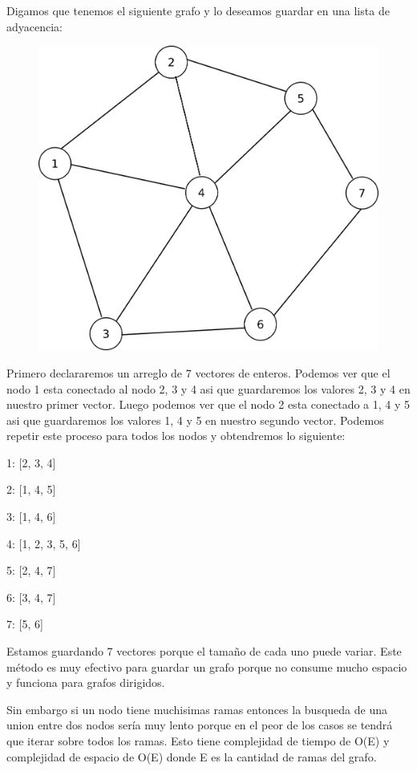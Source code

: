 \documentclass{article}
\begin{document}
Digamos que tenemos el siguiente grafo y lo deseamos guardar en una lista de adyacencia:

\begin{figure}[H]
    \centering
    \includegraphics[width=0.32\paperwidth]{lista}
\end{figure}

Primero declararemos un arreglo de 7 vectores de enteros. Podemos ver que el nodo 1 esta conectado al nodo 2, 3 y 4 asi que guardaremos los valores 2, 3 y 4 en nuestro primer vector. Luego podemos ver que el nodo 2 esta conectado a 1, 4 y 5 asi que guardaremos los valores 1, 4 y 5 en nuestro segundo vector. Podemos repetir este proceso para todos los nodos y obtendremos lo siguiente:

1: [2, 3, 4]

2: [1, 4, 5]

3: [1, 4, 6]

4: [1, 2, 3, 5, 6]

5: [2, 4, 7]

6: [3, 4, 7]

7: [5, 6]

Estamos guardando 7 vectores porque el tamaño de cada uno puede variar. Este método es muy efectivo para guardar un grafo porque no consume mucho espacio y funciona para grafos dirigidos.

Sin embargo si un nodo tiene muchisimas ramas entonces la busqueda de una union entre dos nodos sería muy lento porque en el peor de los casos se tendrá que iterar sobre todos los ramas. Esto tiene complejidad de tiempo de O(E) y complejidad de espacio de O(E) donde E es la cantidad de ramas del grafo.
\end{document}
